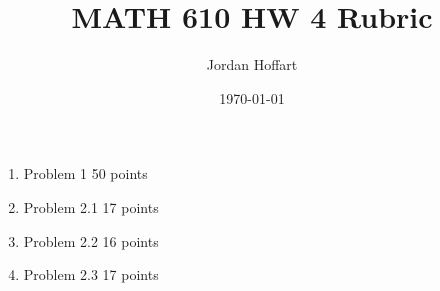 \documentclass{article}
\title{MATH 610 HW 4 Rubric}
\author{Jordan Hoffart}
\date{\today}
\begin{document}
\maketitle

\begin{enumerate}
	\item Problem 1 50 points
	\item Problem 2.1 17 points
	\item Problem 2.2 16 points
	\item Problem 2.3 17 points
\end{enumerate}
\end{document}
